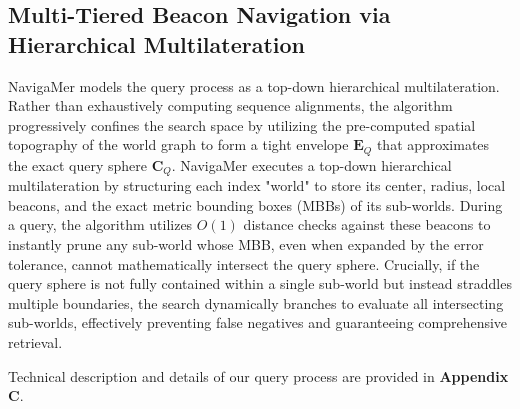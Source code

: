 \documentclass[unnumsec,webpdf,contemporary,large]{oup-authoring-template}%
\theoremstyle{thmstyleone}%
\theoremstyle{thmstyletwo}%
\theoremstyle{thmstylethree}%
\begin{document}




\subsection{Multi-Tiered Beacon Navigation via Hierarchical Multilateration}



NavigaMer models the query process as a top-down hierarchical multilateration. Rather than exhaustively computing sequence alignments, the algorithm progressively confines the search space by utilizing the pre-computed spatial topography of the world graph to form a tight envelope $\textbf{E}_Q$ that approximates the exact query sphere $\textbf{C}_Q$.
NavigaMer executes a top-down hierarchical multilateration by structuring each index "world" to store its center, radius, local beacons, and the exact metric bounding boxes (MBBs) of its sub-worlds. During a query, the algorithm utilizes $O(1)$ distance checks against these beacons to instantly prune any sub-world whose MBB, even when expanded by the error tolerance, cannot mathematically intersect the query sphere. Crucially, if the query sphere is not fully contained within a single sub-world but instead straddles multiple boundaries, the search dynamically branches to evaluate all intersecting sub-worlds, effectively preventing false negatives and guaranteeing comprehensive retrieval.

Technical description and details of our query process are provided in \textbf{Appendix C}.
\end{document}
